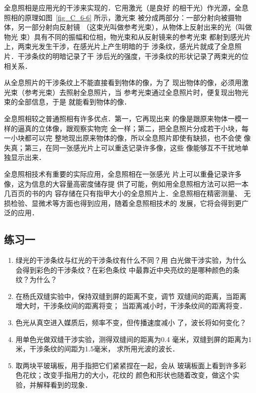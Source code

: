 全息照相是应用光的干涉来实现的．它用激光（是良好
的相干光）作光源，全息照相的原理如图~\ref{fig_C_6-6} 所示，激光束
被分成两部分：一部分射向被摄物体，另一部分射向反射镜
（这束光叫做参考光束），从物体上反射出来的光（叫做物光
束）具有不同的振幅和位相，物光束和从反射镜来的参考光束
都射到感光片上，两束光发生干涉，在感光片上产生明暗的于
涉条纹，感光片就成了全息照片．干涉条纹的明暗记录了干
涉后光的强度，干涉条纹的形状记录了两束光的位相关系．

从全息照片的干涉条纹上不能直接看到物体的像，为了
现出物体的像，必须用激光束（参考光束）去照射全息照片，当
参考光束通过全息照片时，便复现出物光束的全部信息，于是
就能看到物体的像．

全息照相较之普通照相有许多优点．第一，它再现出来
的像是跟原来物体一模一样的逼真的立体像，跟观察实物完
全一样；第二，把全息照片分成若干小块，每一小块都可以完
整地现出原来物体的像，所以全息照片即使有缺损，也不会使
像失真；第三，在同一张感光片上可以重迭记录许多像，这些
像能够互不干扰地单独显示出来．

全息照相技术有重要的实际应用，全息照相在一张感光
片上可以重叠记录许多像，这为信息的大容量高密度储存提
供了可能，例如用全息照相方法可以把一本几百页的书的内
容存储在只有指甲大小的全息照片上．全息照相在精密测量、
无损检验、显微术等方面也得到应用，随着全息照相技术的
发展，它将会得到更广泛的应用．

\subsection*{练习一}

\begin{enumerate}
\item 绿光的干涉条纹与红光的干涉条纹有什么不同？用
白光做干涉实验，为什么会得到彩色的干涉条纹？在彩色条纹
中最靠近中央亮纹的是哪种颜色的条纹？为什么？
\item 在杨氏双缝实验中，保持双缝到屏的距离不变，调节
双缝间的距离，当距离增大时，干涉条纹间的距离将变\underline{\qquad}；
当距离减小时，干涉条纹间的距离将变\underline{\qquad}．
\item 色光从真空进入媒质后，频率不变，但传播速度减小
了，波长将如何变化？
\item 用单色光做双缝干涉实验，测得双缝间的距离为0.4
毫米，双缝到屏的距离为1米，干涉条纹的间距为1.5毫米，
求所用光波的波长．
\item 取两块平玻璃板，用手指把它们紧紧捏在一起，会从
玻璃板面上看到许多彩色花纹；改变手指用力的大小，花纹的
颜色和形状也随着改变，做这个实验，并解释看到的现象．
\end{enumerate}

